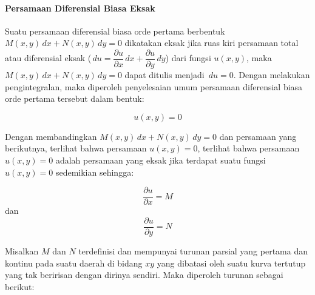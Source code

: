 \paragraph{Persamaan Diferensial Biasa Eksak}
\label{par:PDBE}

Suatu persamaan diferensial biasa orde pertama berbentuk \begin{math} M(x,y) \, dx + N(x, y) \, dy = 0 \end{math} dikatakan eksak jika ruas kiri persamaan total atau diferensial eksak (\begin{math} \, du = \dfrac{\partial u}{\partial x} \, dx + \dfrac{\partial u}{\partial y} \, dy\end{math}) dari fungsi \begin{math} u(x, y) \end{math}, maka \begin{math} M(x,y) \, dx + N(x, y) \, dy = 0 \end{math} dapat ditulis menjadi \begin{math} \, du = 0 \end{math}. Dengan melakukan pengintegralan, maka diperoleh penyelesaian umum persamaan diferensial biasa orde pertama tersebut dalam bentuk:

\begin{displaymath} u(x, y) = 0 \end{displaymath}

Dengan membandingkan \begin{math} M(x, y) \, dx + N(x, y) \, dy = 0 \end{math} dan persamaan yang berikutnya, terlihat bahwa persamaan \begin{math} u(x, y) = 0 \end{math}, terlihat bahwa persamaan \begin{math} u(x, y) = 0 \end{math} adalah persamaan yang eksak
jika terdapat suatu fungsi \begin{math} u(x, y) = 0 \end{math} sedemikian sehingga:

\begin{displaymath} \dfrac{\partial u}{\partial x} = M \end{displaymath} dan \begin{displaymath} \dfrac{\partial u}{\partial y} = N \end{displaymath}

Misalkan \begin{math} M \end{math} dan \begin{math} N \end{math} terdefinisi dan mempunyai turunan parsial yang pertama dan kontinu pada suatu daerah di bidang \begin{math} xy \end{math} yang dibatasi oleh suatu kurva tertutup yang tak beririsan dengan dirinya sendiri.
Maka diperoleh turunan sebagai berikut:

